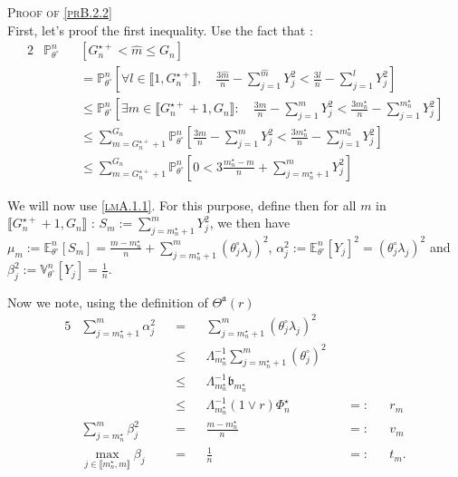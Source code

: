 \begin{pro}{\textsc{Proof of \textsc{\cref{prB.2.2}}} \\}
First, let's proof the first inequality.
Use the fact that : 
\begin{alignat*}{2}
& \mathds{P}_{\theta^{\circ}}^{n}&&\left[G_{n}^{\star +} < \widehat{m} \leq G_{n}\right] \\
& &&= \mathds{P}_{\theta^{\circ}}^{n} \left[\forall l \in \llbracket 1, G_{n}^{\star+}\rrbracket, \quad \frac{3 \widehat{m}}{n} - \sum\limits_{j=1}^{\widehat{m}} Y_{j}^{2} < \frac{3 l}{n} - \sum\limits_{j=1}^{l} Y_{j}^{2} \right]\\
& && \leq \mathds{P}_{\theta^{\circ}}^{n}\left[\exists m \in \llbracket G_{n}^{\star+} + 1, G_{n}\rrbracket : \quad \frac{3 m}{n} - \sum\limits_{j=1}^{m} Y_{j}^{2} < \frac{3 m_{n}^{\star}}{n} - \sum\limits_{j=1}^{m_{n}^{\star}} Y_{j}^{2} \right]\\
& && \leq \sum\limits_{m = G_{n}^{\star+} + 1}^{G_{n}} \mathds{P}_{\theta^{\circ}}^{n}\left[\frac{3 m}{n} - \sum\limits_{j=1}^{m} Y_{j}^{2} < \frac{3 m_{n}^{\star}}{n} - \sum\limits_{j=1}^{m_{n}^{\star}} Y_{j}^{2}\right]\\
& && \leq \sum\limits_{m = G_{n}^{\star+} + 1}^{G_{n}} \mathds{P}_{\theta^{\circ}}^{n}\left[0 <  3 \frac{m_{n}^{\star} - m}{n} + \sum\limits_{j = m_{n}^{\star} + 1}^{m} Y_{j}^{2}\right]
\end{alignat*}

We will now use \textsc{\cref{lmA.1.1}}. For this purpose, define then for all $m$ in $\llbracket G_{n}^{\star+} + 1, G_{n} \rrbracket$ : $S_{m} := \sum\limits_{j = m_{n}^{\star} + 1}^{m} Y_{j}^{2}$, we then have $\mu_{m} := \mathds{E}_{\theta^{\circ}}^{n}\left[S_{m}\right] = \frac{m- m_{n}^{\star}}{n} + \sum\limits_{j = m_{n}^{\star} + 1}^{m} \left(\theta^{\circ}_{j}\lambda_{j}\right)^{2}$, $\alpha_{j}^{2} := \mathds{E}_{\theta^{\circ}}^{n}\left[Y_{j}\right]^{2} =  \left(\theta^{\circ}_{j}\lambda_{j}\right)^{2}$ and $\beta_{j}^{2} := \mathds{V}_{\theta^{\circ}}^{n}\left[Y_{j}\right] = \frac{1}{n}$.

Now we note, using the definition of $\Theta^{\mathfrak{a}}(r)$
\begin{alignat*}{5}
& \sum\limits_{j = m_{n}^{\star} + 1}^{m} \alpha_{j}^{2} && = && \sum\limits_{j = m_{n}^{\star} + 1}^{m}\left(\theta^{\circ}_{j}\lambda_{j}\right)^{2}&& && \\
& && \leq && \Lambda_{m_{n}^{\star}}^{-1} \sum\limits_{j = m_{n}^{\star} + 1}^{m}\left(\theta^{\circ}_{j}\right)^{2} && && \\
& && \leq && \Lambda_{m_{n}^{\star}}^{-1} \mathfrak{b}_{m_{n}^{\star}} && &&\\
& && \leq && \Lambda_{m_{n}^{\star}}^{-1} \left( 1 \vee r\right) \Phi_{n}^{\star} && =: && r_{m}\\
& \sum\limits_{j = m_{n}^{\star}}^{m} \beta_{j}^{2} && = && \frac{m - m_{n}^{\star}}{n} && =: && v_{m}\\
& \max\limits_{j \in \llbracket m_{n}^{\star}, m \rrbracket} \beta_{j} && = && \frac{1}{n} && =: && t_{m}.
\end{alignat*}


\end{pro}
